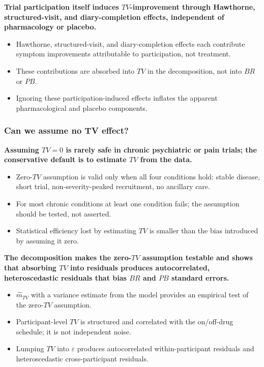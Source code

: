 \documentclass[
  11pt,
]{article}
\begin{document}
\textbf{Trial participation itself induces $TV$-improvement through Hawthorne, structured-visit, and diary-completion effects, independent of pharmacology or placebo.}

\begin{itemize}\setlength{\itemsep}{2pt}\setlength{\parskip}{0pt}
\item Hawthorne, structured-visit, and diary-completion effects each contribute symptom improvements attributable to participation, not treatment.
\item These contributions are absorbed into $TV$ in the decomposition, not into $BR$ or $PB$.
\item Ignoring these participation-induced effects inflates the apparent pharmacological and placebo components.
\end{itemize}

\subsubsection{Can we assume no TV effect?}\label{can-we-assume-no-tv-effect}

\textbf{Assuming $TV = 0$ is rarely safe in chronic psychiatric or pain trials; the conservative default is to estimate $TV$ from the data.}

\begin{itemize}\setlength{\itemsep}{2pt}\setlength{\parskip}{0pt}
\item Zero-$TV$ assumption is valid only when all four conditions hold: stable disease, short trial, non-severity-peaked recruitment, no ancillary care.
\item For most chronic conditions at least one condition fails; the assumption should be tested, not asserted.
\item Statistical efficiency lost by estimating $TV$ is smaller than the bias introduced by assuming it zero.
\end{itemize}

\textbf{The decomposition makes the zero-$TV$ assumption testable and shows that absorbing $TV$ into residuals produces autocorrelated, heteroscedastic residuals that bias $BR$ and $PB$ standard errors.}

\begin{itemize}\setlength{\itemsep}{2pt}\setlength{\parskip}{0pt}
\item $\hat{m}_{TV}$ with a variance estimate from the model provides an empirical test of the zero-$TV$ assumption.
\item Participant-level $TV$ is structured and correlated with the on/off-drug schedule; it is not independent noise.
\item Lumping $TV$ into $\varepsilon$ produces autocorrelated within-participant residuals and heteroscedastic cross-participant residuals.
\end{itemize}
\end{document}
